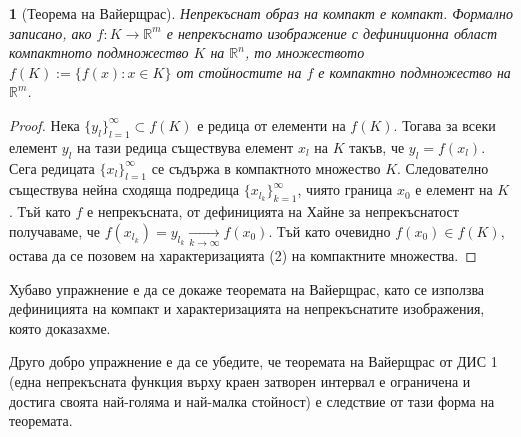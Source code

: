 \documentclass[11pt]{article}
\numberwithin{equation}{section}
\numberwithin{figure}{section}
\numberwithin{table}{section}
\theoremstyle{plain}
\newtheorem{thm}{\protect\theoremname}[section]
\theoremstyle{definition}
\theoremstyle{remark}
\theoremstyle{definition}
\theoremstyle{remark}
\theoremstyle{plain}
\theoremstyle{definition}
\theoremstyle{definition}
\theoremstyle{plain}
\theoremstyle{plain}
\theoremstyle{plain}
\theoremstyle{definition}
\theoremstyle{plain}
\providecommand{\theoremname}{Теорема}
\newcommand*{\R}{\mathbb{R}}
\begin{document}
\begin{thm}[Теорема на Вайерщрас]
Непрекъснат образ на компакт е компакт. Формално записано, ако
$f: K  \longrightarrow \R^m$ е непрекъснато изображение с дефиниционна област компактното подмножество $K$ на $\R^n$, то множеството  $f(K) := \{f(x):x\in K\}$ от стойностите на $f$ е компактно подмножество на $\R^m$.
\end{thm}
\begin{proof}
Нека $\{y_l\}_{l=1}^\infty \subset f(K)$ е редица от елементи на $f(K)$. Тогава за всеки елемент $y_l$ на тази редица съществува елемент  $x_l$ на $K$ такъв, че $y_l = f(x_l)$. Сега редицата $\{x_l\}_{l=1}^\infty$ се съдържа в компактното множество $K$. Следователно съществува нейна сходяща подредица $\{ x_{l_k}\}_{k=1}^\infty$, чиято граница $x_0$ е елемент на $K$. Тъй като $f$ е непрекъсната, от дефиницията на Хайне за непрекъснатост получаваме, че $f(x_{l_k}) = y_{l_k} \xrightarrow[k \rightarrow \infty]{} f(x_0)$. Тъй като очевидно $f(x_0)\in f(K)$, остава да се позовем на характеризацията (2) на компактните множества.
\end{proof}

Хубаво упражнение е да се докаже теоремата на Вайерщрас, като се използва дефиницията на компакт и характеризацията на непрекъснатите изображения, която доказахме.

Друго добро упражнение е да се убедите, че теоремата на Вайерщрас от ДИС 1 (една непрекъсната функция върху краен затворен интервал е ограничена и достига своята най-голяма и най-малка стойност) е следствие от тази форма на теоремата.

\bigskip
\end{document}
